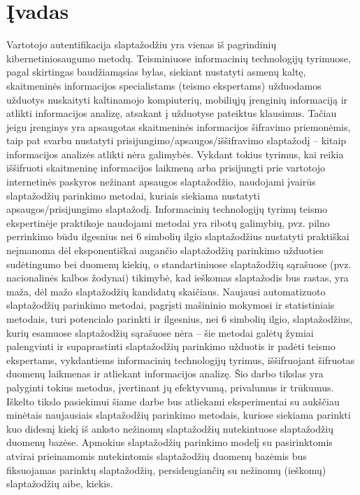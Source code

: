 \documentclass{VUMIFInfBakalaurinis}
\begin{document}
\section{Įvadas}
Vartotojo autentifikacija slaptažodžiu yra vienas iš pagrindinių 
kibernetiniosaugumo metodų. Teisminiuose informacinių technologijų tyrimuose, 
pagal skirtingas baudžiamąsias bylas, siekiant nustatyti asmenų kaltę, 
skaitmeninės informacijos specialistams (teismo ekspertams) užduodamos užduotys 
nuskaityti kaltinamojo kompiuterių, mobiliųjų įrenginių informaciją ir atlikti 
informacijos analizę, atsakant į užduotyse pateiktus klausimus. Tačiau jeigu 
įrenginys yra apsaugotas skaitmeninės informacijos šifravimo priemonėmis, taip 
pat svarbu nustatyti prisijungimo/apsaugos/iššifravimo slaptažodį -- kitaip 
informacijos analizės atlikti nėra galimybės. Vykdant tokius tyrimus, kai reikia 
iššifruoti skaitmeninę informacijos laikmeną arba prisijungti prie vartotojo 
internetinės paskyros nežinant apsaugos slaptažodžio, naudojami įvairūs 
slaptažodžių parinkimo metodai, kuriais siekiama nustatyti apsaugos/prisijungimo 
slaptažodį. Informacinių technologijų tyrimų teismo ekspertinėje praktikoje 
naudojami metodai yra ribotų galimybių, pvz. pilno perrinkimo būdu ilgesnius nei 
6 simbolių ilgio slaptažodžius nustatyti praktiškai neįmanoma dėl eksponentiškai 
augančio slaptažodžių parinkimo užduoties sudėtingumo bei duomenų kiekių, o 
standartiniuose slaptažodžių sąrašuose (pvz. nacionalinės kalbos žodynai) 
tikimybė, kad ieškomas slaptažodis bus rastas, yra maža, dėl mažo slaptažodžių 
kandidatų skaičiaus. Naujausi automatizuoto slaptažodžių parinkimo metodai, 
pagrįsti mašininio mokymosi ir statistiniais metodais, turi potencialo parinkti 
ir ilgesnius, nei 6 simbolių ilgio, slaptažodžius, kurių esamuose slaptažodžių 
sąrašuose nėra -- šie metodai galėtų žymiai palengvinti ir supaprastinti 
slaptažodžių parinkimo užduotis ir padėti teismo ekspertams, vykdantiems 
informacinių technologijų tyrimus, iššifruojant šifruotas duomenų laikmenas ir 
atliekant informacijos analizę. Šio darbo tikslas yra palyginti tokius metodus, 
įvertinant jų efektyvumą, privalumus ir trūkumus. Iškelto tikslo pasiekimui 
šiame darbe bus atliekami eksperimentai su aukščiau minėtais naujausiais 
slaptažodžių parinkimo metodais, kuriose siekiama parinkti kuo didesnį kiekį iš 
anksto nežinomų slaptažodžių nutekintuose slaptažodžių duomenų bazėse. Apmokius 
slaptažodžių parinkimo modelį su pasirinktomis atvirai prieinamomis nutekintomis 
slaptažodžių duomenų bazėmis bus fiksuojamas parinktų slaptažodžių, 
persidengiančių su nežinomų (ieškomų) slaptažodžių aibe, kiekis.
\end{document}
